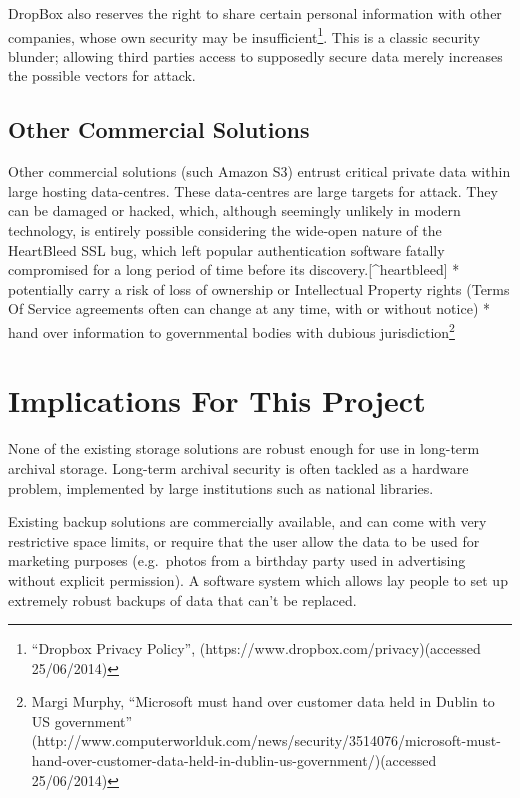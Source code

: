 \documentclass[12pt,a4paper,]{adreport}
\begin{document}
DropBox also reserves the right to share certain personal information
with other companies, whose own security may be insufficient\footnote{``Dropbox
  Privacy Policy'', (https://www.dropbox.com/privacy)(accessed
  25/06/2014)}. This is a classic security blunder; allowing third
parties access to supposedly secure data merely increases the possible
vectors for attack.

\subsection{Other Commercial
Solutions}\label{other-commercial-solutions}

Other commercial solutions (such Amazon S3) entrust critical private
data within large hosting data-centres. These data-centres are large
targets for attack. They can be damaged or hacked, which, although
seemingly unlikely in modern technology, is entirely possible
considering the wide-open nature of the HeartBleed SSL bug, which left
popular authentication software fatally compromised for a long period of
time before its discovery.{[}\^{}heartbleed{]} * potentially carry a
risk of loss of ownership or Intellectual Property rights (Terms Of
Service agreements often can change at any time, with or without notice)
* hand over information to governmental bodies with dubious
jurisdiction\footnote{Margi Murphy, ``Microsoft must hand over customer
  data held in Dublin to US government''
  (http://www.computerworlduk.com/news/security/3514076/microsoft-must-hand-over-customer-data-held-in-dublin-us-government/)(accessed
  25/06/2014)}

\section{Implications For This
Project}\label{implications-for-this-project}

None of the existing storage solutions are robust enough for use in
long-term archival storage. Long-term archival security is often tackled
as a hardware problem, implemented by large institutions such as
national libraries.

Existing backup solutions are commercially available, and can come with
very restrictive space limits, or require that the user allow the data
to be used for marketing purposes (e.g.~photos from a birthday party
used in advertising without explicit permission). A software system
which allows lay people to set up extremely robust backups of data that
can't be replaced.
\end{document}
